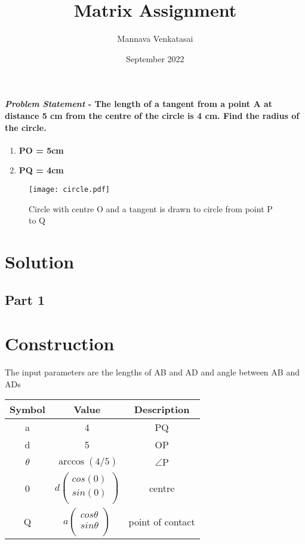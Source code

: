\documentclass[journal,10pt,twocolumn]{article}
\title{\textbf{Matrix Assignment}}
\author{Mannava Venkatasai}
\date{September 2022}
\begin{document}
\maketitle
\paragraph{\textit{Problem Statement} - The length of a tangent from a point A at distance 5 cm from the centre of the circle is 4
cm. Find the radius of the circle.}
\begin{enumerate}
	\item \textbf{PO = 5cm}
	\item \textbf{PQ = 4cm}
\end{enumerate}
\begin{figure}[h]
\centering
\texttt{[image: circle.pdf]}
\caption{Circle with centre O and a tangent is drawn to circle from point P to Q}
\label{fig:Circle}
\end{figure}

\section*{Solution}
\subsection*{Part 1}
\section*{Construction}
The input parameters are the lengths of AB and AD and angle between AB and ADs \vspace{2mm}\\
{
\setlength\extrarowheight{2pt}
\begin{tabular}{|c|c|c|}
 \hline
 \textbf{Symbol}&\textbf{Value}&\textbf{Description}\\
 \hline
 a&4&PQ\\
 \hline
 d&5&OP\\
 \hline
	$\theta$&$\arccos(4/5)$&$\angle$P\\
 \hline
 0&$d%
 \begin{pmatrix}
  cos(0)\\
  sin(0)\\
 \end{pmatrix}$%
 &centre\\
 \hline
 Q&$a%
 \begin{pmatrix}
  cos\theta\\
  sin\theta\\
 \end{pmatrix}$%
 &point of contact\\
 \hline
\end{tabular}
}
\end{document}
